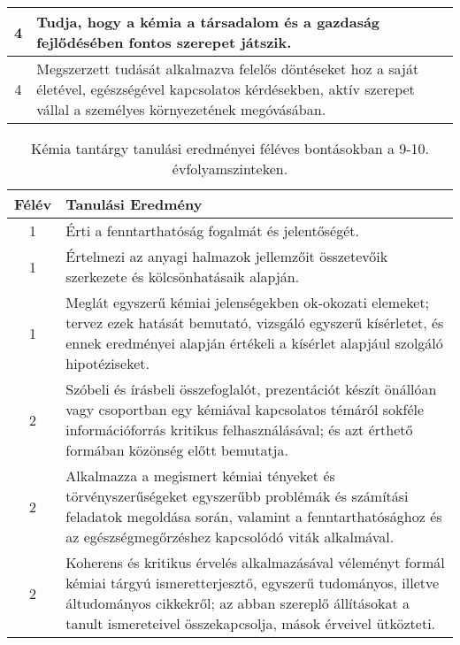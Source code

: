 \begin{longtable}{c | p{} }
                                
                                          4 &  Tudja, hogy a kémia a társadalom és a gazdaság fejlődésében fontos szerepet játszik. \\ \hline
                                          4 &  Megszerzett tudását alkalmazva felelős döntéseket hoz a saját életével, egészségével kapcsolatos kérdésekben, aktív szerepet vállal a személyes környezetének megóvásában. \\ \hline
                                      
                        \end{longtable}
            \clearpage

       
           \begin{longtable}{c | p{} }
            \caption[Kémia 9-10.]{Kémia tantárgy tanulási eredményei féléves bontásokban a 9-10. évfolyamszinteken. }  \\

            \textbf{Félév} & \textbf{Tanulási Eredmény} \\
            \hline
            \endhead
                                
                                          1 &  Érti a fenntarthatóság fogalmát és jelentőségét. \\ \hline
                                          1 &  Értelmezi az anyagi halmazok jellemzőit összetevőik szerkezete és kölcsönhatásaik alapján. \\ \hline
                                          1 &  Meglát egyszerű kémiai jelenségekben ok-okozati elemeket; tervez ezek hatását bemutató, vizsgáló egyszerű kísérletet, és ennek eredményei alapján értékeli a kísérlet alapjául szolgáló hipotéziseket. \\ \hline
                                      
                                
                                          2 &  Szóbeli és írásbeli összefoglalót, prezentációt készít önállóan vagy csoportban egy kémiával kapcsolatos témáról sokféle információforrás kritikus felhasználásával; és azt érthető formában közönség előtt bemutatja. \\ \hline
                                          2 &  Alkalmazza a megismert kémiai tényeket és törvényszerűségeket egyszerűbb problémák és számítási feladatok megoldása során, valamint a fenntarthatósághoz és az egészségmegőrzéshez kapcsolódó viták alkalmával. \\ \hline
                                          2 &  Koherens és kritikus érvelés alkalmazásával véleményt formál kémiai tárgyú ismeretterjesztő, egyszerű tudományos, illetve áltudományos cikkekről; az abban szereplő állításokat a tanult ismereteivel összekapcsolja, mások érveivel ütközteti. \\ \hline
                                      

\end{longtable}
